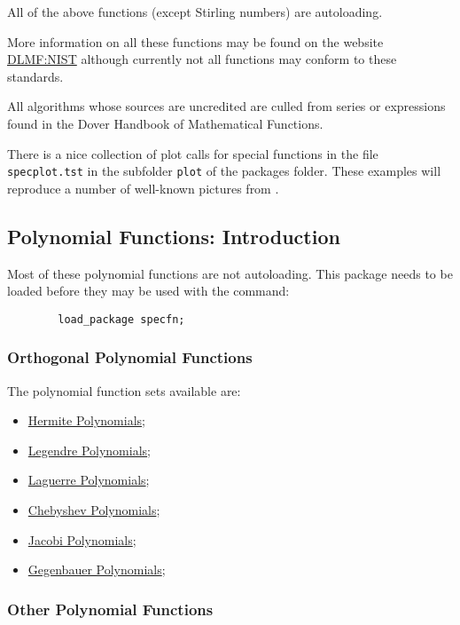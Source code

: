 All of the above functions (except Stirling numbers) are autoloading.

More information on all these functions may be found on the website
\href{https://dlmf.nist.gov/}{DLMF:NIST} although currently not all functions
may conform to these standards.

All algorithms whose sources are uncredited are culled from series or
expressions found in the Dover Handbook of Mathematical
Functions\cite{AbramowitzStegun:72}.

There is a nice collection of plot calls for special functions
in the file \texttt{specplot.tst} in the subfolder \texttt{plot} of the
packages folder. These examples will reproduce a number of well-known
pictures from \cite{AbramowitzStegun:72}.

\subsection{Polynomial Functions: Introduction}
Most of these polynomial functions are not  autoloading. This package needs
to be loaded before they may be used with the command:
\begin{verbatim}
        load_package specfn;
\end{verbatim}

\subsubsection{Orthogonal Polynomial Functions}

The polynomial function sets available are:
\begin{itemize}
\item \hyperlink{HERMITEP}{Hermite Polynomials};
\item \hyperlink{LEGENDREP}{Legendre Polynomials};
\item \hyperlink{LAGUERREP}{Laguerre Polynomials};
\item \hyperlink{CHEBYSHEVP}{Chebyshev Polynomials};
\item \hyperlink{JACOBIP}{Jacobi Polynomials};
\item \hyperlink{GEGENBAUERP}{Gegenbauer Polynomials};
\end{itemize}

\subsubsection{Other Polynomial Functions}

